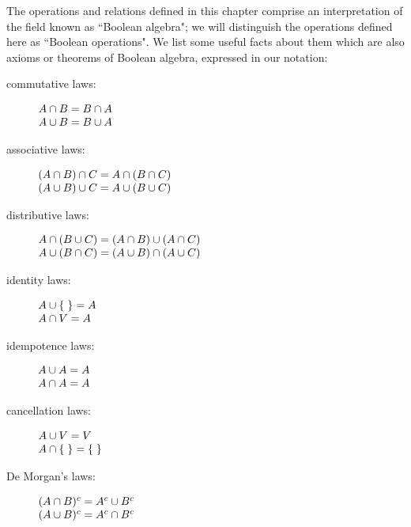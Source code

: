 The operations and relations defined in this chapter comprise
an interpretation of the field known as ``Boolean algebra"; we will distinguish the operations defined here as
``Boolean operations".  We list some useful facts about them which are also
axioms or theorems of Boolean algebra, expressed in our notation:

\begin{description}
\item[\fdescr commutative laws:]
  $\begin{array}[t]{@{}l}
    A \cap B = B \cap A\\ A \cup B = B \cup A
   \end{array}$

\item[\fdescr associative laws:]
  $\begin{array}[t]{@{}l}
    (A \cap B) \cap C = A \cap (B \cap C)\\
    (A \cup B) \cup C = A \cup (B \cup C)
   \end{array}$

\item[\fdescr distributive laws:]
  $\begin{array}[t]{@{}l}
    A \cap (B \cup C) = (A \cap B) \cup (A \cap C)\\
    A \cup (B \cap C) = (A \cup B) \cap (A \cup C)
   \end{array}$

\item[\fdescr identity laws:]
  $\begin{array}[t]{@{}l}
    A \cup \vide = A\\ A \cap V = A
   \end{array}$

\item[\fdescr idempotence laws:]
  $\begin{array}[t]{@{}l}
    A \cup A = A\\ A \cap A = A
   \end{array}$

\item[\fdescr cancellation laws:]
  $\begin{array}[t]{@{}l}
    A \cup V = V\\ A \cap \vide = \vide
   \end{array}$

\item[\fdescr De Morgan's laws:]
  $\begin{array}[t]{@{}l}
   (A \cap B)^c = A^c \cup B^c\\ (A \cup B)^c = A^c \cap B^c
   \end{array}$


\end{description}
